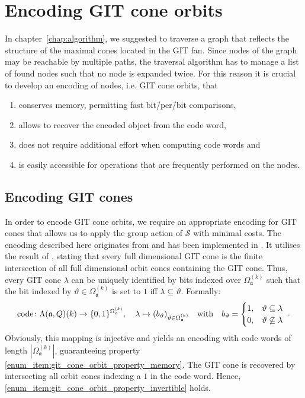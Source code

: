 \section{Encoding GIT cone orbits}
\label{sec:git_cone_management}
In chapter~\ref{chap:algorithm}, we suggested to traverse a graph that reflects the structure of the maximal cones located in the GIT fan. Since nodes of the graph may be reachable by multiple paths, the traversal algorithm has to manage a list of found nodes such that no node is expanded twice. For this reason it is crucial to develop an encoding of nodes, i.e. GIT cone orbits, that 
\begin{enumerate}[label={\upshape(\roman*)}]
	\item conserves memory, permitting fast bit\=/per\=/bit comparisons,
		\label{enum_item:git_cone_orbit_property_memory}
	\item allows to recover the encoded object from the code word,
		\label{enum_item:git_cone_orbit_property_invertible}
	\item does not require additional effort when computing code words and
		 \label{enum_item:git_cone_orbit_property_computation_effort}
	\item is easily accessible for operations that are frequently performed on the nodes.
		\label{enum_item:git_cone_orbit_property_operations}
\end{enumerate}

\subsection*{Encoding GIT cones}
In order to encode GIT cone orbits, we require an appropriate encoding for GIT cones that allows us to apply the group action of $\mathcal{S}$ with minimal costs. The encoding described here originates from \cite[Construction 4.3]{gitfan_symmetry} and has been implemented in \gitfanlib{}. It utilises the result of , stating that every full dimensional GIT cone is the finite intersection of all full dimensional orbit cones containing the GIT cone. Thus, every GIT cone $\lambda$ can be uniquely identified by bits indexed over $\Omega_\mathfrak{a}^{(k)}$ such that the bit indexed by $\vartheta\in\Omega_\mathfrak{a}^{(k)}$ is set to $1$ iff $\lambda \subseteq \vartheta$. Formally:
$$\text{code}\colon \Lambda(\mathfrak{a},Q)(k) \rightarrow \{0,1\}^{\Omega_\mathfrak{a}^{(k)}},\quad
\lambda \mapsto (b_\vartheta)_{\vartheta\in\Omega_\mathfrak{a}^{(k)}}\quad\text{with}\quad
b_\vartheta = 
\begin{cases}
1, & \vartheta\subseteq\lambda \\
0, & \vartheta\not\subseteq\lambda
\end{cases}\ .
$$
Obviously, this mapping is injective and yields an encoding with code words of length $|\Omega_\mathfrak{a}^{(k)}|$, guaranteeing property \ref{enum_item:git_cone_orbit_property_memory}. The GIT cone is recovered by intersecting all orbit cones indexing a $1$ in the code word. Hence, \ref{enum_item:git_cone_orbit_property_invertible} holds.

